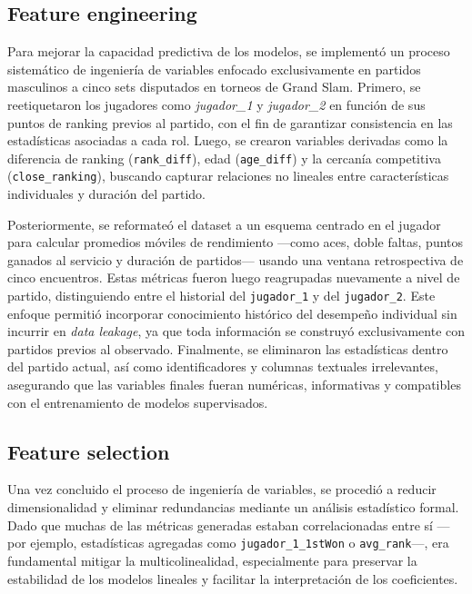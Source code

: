 \documentclass[
  letterpaper,
  DIV=11,
  numbers=noendperiod]{scrartcl}
\begin{document}
\hypertarget{feature-engineering}{%
\subsection{Feature engineering}\label{feature-engineering}}

Para mejorar la capacidad predictiva de los modelos, se implementó un
proceso sistemático de ingeniería de variables enfocado exclusivamente
en partidos masculinos a cinco sets disputados en torneos de Grand Slam.
Primero, se reetiquetaron los jugadores como \emph{jugador\_1} y
\emph{jugador\_2} en función de sus puntos de ranking previos al
partido, con el fin de garantizar consistencia en las estadísticas
asociadas a cada rol. Luego, se crearon variables derivadas como la
diferencia de ranking (\texttt{rank\_diff}), edad (\texttt{age\_diff}) y
la cercanía competitiva (\texttt{close\_ranking}), buscando capturar
relaciones no lineales entre características individuales y duración del
partido.

Posteriormente, se reformateó el dataset a un esquema centrado en el
jugador para calcular promedios móviles de rendimiento ---como aces,
doble faltas, puntos ganados al servicio y duración de partidos---
usando una ventana retrospectiva de cinco encuentros. Estas métricas
fueron luego reagrupadas nuevamente a nivel de partido, distinguiendo
entre el historial del \texttt{jugador\_1} y del \texttt{jugador\_2}.
Este enfoque permitió incorporar conocimiento histórico del desempeño
individual sin incurrir en \emph{data leakage}, ya que toda información
se construyó exclusivamente con partidos previos al observado.
Finalmente, se eliminaron las estadísticas dentro del partido actual,
así como identificadores y columnas textuales irrelevantes, asegurando
que las variables finales fueran numéricas, informativas y compatibles
con el entrenamiento de modelos supervisados.

\hypertarget{feature-selection}{%
\subsection{Feature selection}\label{feature-selection}}

Una vez concluido el proceso de ingeniería de variables, se procedió a
reducir dimensionalidad y eliminar redundancias mediante un análisis
estadístico formal. Dado que muchas de las métricas generadas estaban
correlacionadas entre sí ---por ejemplo, estadísticas agregadas como
\texttt{jugador\_1\_1stWon} o \texttt{avg\_rank}---, era fundamental
mitigar la multicolinealidad, especialmente para preservar la
estabilidad de los modelos lineales y facilitar la interpretación de los
coeficientes.
\end{document}
